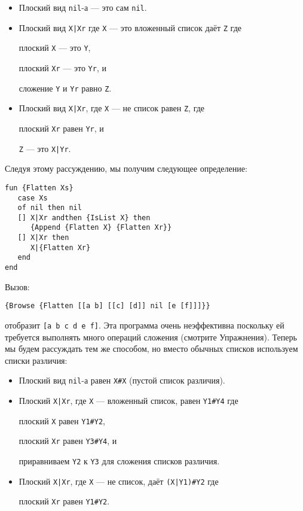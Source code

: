 \begin{itemize}
\item{Плоский вид \lstinline!nil!-а --- это сам \lstinline!nil!.}

\item{Плоский вид \lstinline!X|Xr! где \lstinline!X! --- это вложенный список даёт \lstinline!Z! где

  плоский \lstinline!X! --- это \lstinline!Y!,
  
  плоский \lstinline!Xr! --- это \lstinline!Yr!, и
  
  сложение \lstinline!Y! и \lstinline!Yr! равно \lstinline!Z!.}

\item{Плоский вид \lstinline!X|Xr!, где \lstinline!X! --- не список равен \lstinline!Z!, где

  плоский \lstinline!Xr! равен \lstinline!Yr!, и
  
  \lstinline!Z! --- это \lstinline!X|Yr!.}
\end{itemize}

Следуя этому рассуждению, мы получим следующее определение:

\begin{lstlisting}
fun {Flatten Xs}
   case Xs
   of nil then nil
   [] X|Xr andthen {IsList X} then
      {Append {Flatten X} {Flatten Xr}}
   [] X|Xr then
      X|{Flatten Xr}
   end
end
\end{lstlisting}

Вызов:

\begin{lstlisting}
{Browse {Flatten [[a b] [[c] [d]] nil [e [f]]]}}
\end{lstlisting}

отобразит \lstinline![a b c d e f]!. Эта программа очень неэффективна поскольку ей требуется выполнять много операций сложения (смотрите Упражнения). Теперь мы будем рассуждать тем же способом, но вместо обычных списков используем списки различия:

\begin{itemize}
\item{Плоский вид \lstinline!nil!-а равен \lstinline|X#X| (пустой список различия).}

\item{Плоский \lstinline!X|Xr!, где \lstinline!X! --- вложенный список, равен \lstinline|Y1#Y4| где

  плоский \lstinline!X! равен \lstinline|Y1#Y2|,
  
  плоский \lstinline!Xr! равен \lstinline|Y3#Y4|, и
  
  приравниваем \lstinline!Y2! к \lstinline!Y3! для сложения списков различия.}

\item{Плоский \lstinline!X|Xr!, где \lstinline!X! --- не список, даёт \lstinline!(X|Y1)#Y2! где

  плоский \lstinline!Xr! равен \lstinline|Y1#Y2|.}
\end{itemize}

